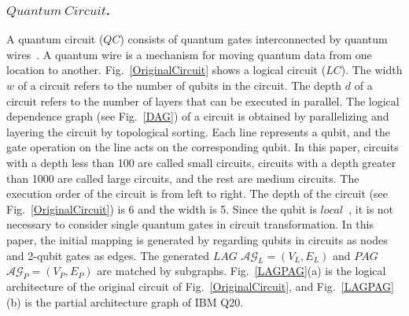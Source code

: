 \documentclass[runningheads]{llncs}
\begin{document}
 \subsubsection{$Quantum \ Circuit$.}
A quantum circuit ($QC$) consists of quantum gates interconnected by quantum wires~\cite{Daei2020}.
A quantum wire is a mechanism for moving quantum data from one location to another.
Fig.~\ref{OriginalCircuit} shows a logical circuit ($LC$).
 The width $w$ of a circuit refers to the number of qubits in the circuit.
 The depth $d$ of a circuit refers to the number of layers that can be executed in parallel.
The logical dependence graph (see Fig.~\ref{DAG}) of a circuit is obtained by parallelizing 
and layering the circuit by topological sorting.
Each line represents a qubit, and the gate operation on the line acts on the corresponding qubit.
In this paper, circuits with a depth less than 100 are called small circuits, 
circuits with a depth greater than 1000 are called large circuits, 
and the rest are medium circuits.
The execution order of the circuit is from left to right. 
The depth of the circuit (see Fig.~\ref{OriginalCircuit}) is 6 and the width is 5.
Since the qubit is $local$~\cite{2013Optimization}, 
it is not necessary to consider single quantum gates in circuit transformation. 
In this paper, the initial mapping is generated by regarding qubits in circuits
as nodes and 2-qubit gates as edges. 
The generated $LAG$ $\mathcal{AG}_{L}=(V_{L},E_{L})$ 
and $PAG$ $\mathcal{AG}_{P}=(V_{P},E_{P})$ are matched by subgraphs. 
Fig.~\ref{LAGPAG}(a) is the logical architecture 
of the original circuit of Fig.~\ref{OriginalCircuit},
and Fig.~\ref{LAGPAG}(b) is the partial architecture graph of IBM Q20.
\end{document}
